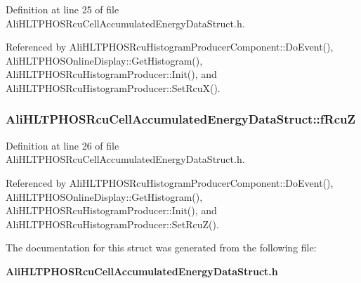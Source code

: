 Definition at line 25 of file Ali\-HLTPHOSRcu\-Cell\-Accumulated\-Energy\-Data\-Struct.h.

Referenced by Ali\-HLTPHOSRcu\-Histogram\-Producer\-Component::Do\-Event(), Ali\-HLTPHOSOnline\-Display::Get\-Histogram(), Ali\-HLTPHOSRcu\-Histogram\-Producer::Init(), and Ali\-HLTPHOSRcu\-Histogram\-Producer::Set\-Rcu\-X().
\subsubsection{ {\bf Ali\-HLTPHOSRcu\-Cell\-Accumulated\-Energy\-Data\-Struct::f\-Rcu\-Z}}\label{structAliHLTPHOSRcuCellAccumulatedEnergyDataStruct_o2}




Definition at line 26 of file Ali\-HLTPHOSRcu\-Cell\-Accumulated\-Energy\-Data\-Struct.h.

Referenced by Ali\-HLTPHOSRcu\-Histogram\-Producer\-Component::Do\-Event(), Ali\-HLTPHOSOnline\-Display::Get\-Histogram(), Ali\-HLTPHOSRcu\-Histogram\-Producer::Init(), and Ali\-HLTPHOSRcu\-Histogram\-Producer::Set\-Rcu\-Z().

The documentation for this struct was generated from the following file:\begin{CompactItemize}
\item 
{\bf Ali\-HLTPHOSRcu\-Cell\-Accumulated\-Energy\-Data\-Struct.h}\end{CompactItemize}
